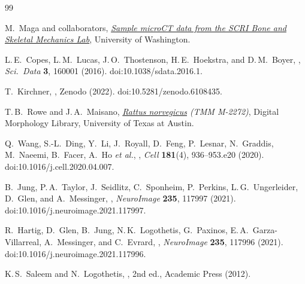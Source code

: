 \documentclass{compactarticle}
\begin{document}
\begin{thebibliography}{99}

 M.~Maga and collaborators,
  \emph{\href{https://faculty.washington.edu/maga/SCRI_MicroCT/}{Sample
  microCT data from the SCRI Bone and Skeletal Mechanics Lab}},
  University of Washington.

 L.\,E.~Copes, L.\,M.~Lucas, J.\,O.~Thostenson,
  H.\,E.~Hoekstra, and D.\,M.~Boyer,
  ,
  \emph{Sci.\ Data} {\bf 3}, 160001 (2016).
  doi:10.1038/sdata.2016.1.

 T.~Kirchner,
  , Zenodo (2022).
  doi:10.5281/zenodo.6108435.

 T.\,B.~Rowe and J.\,A.~Maisano,
  \emph{\href{https://digimorph.org/specimens/Rattus_norvegicus/}{Rattus
  norvegicus} (TMM M-2272)}, Digital Morphology Library, University
  of Texas at Austin.

 Q.~Wang, S.-L.~Ding, Y.~Li, J.~Royall,
  D.~Feng, P.~Lesnar, N.~Graddis, M.~Naeemi, B.~Facer, A.~Ho
  \emph{et al.},
  ,
  \emph{Cell} {\bf 181}(4), 936--953.e20 (2020).
  doi:10.1016/j.cell.2020.04.007.

 B.~Jung, P.\,A.~Taylor, J.~Seidlitz, C.~Sponheim,
  P.~Perkins, L.\,G.~Ungerleider, D.~Glen, and A.~Messinger,
  ,
  \emph{NeuroImage} {\bf 235}, 117997 (2021).
  doi:10.1016/j.neuroimage.2021.117997.

 R.~Hartig, D.~Glen, B.~Jung, N.\,K.~Logothetis,
  G.~Paxinos, E.\,A.~Garza-Villarreal, A.~Messinger, and C.~Evrard,
  ,
  \emph{NeuroImage} {\bf 235}, 117996 (2021).
  doi:10.1016/j.neuroimage.2021.117996.

 K.\,S.~Saleem and N.~Logothetis,
  \emph{}, 2nd ed., Academic Press (2012).


\end{thebibliography}
\end{document}
